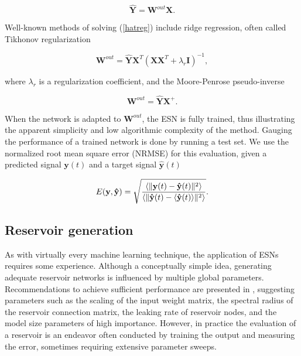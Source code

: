 
\begin{equation}
  \mathbf{\hat{Y}} = \mathbf{W}^{out}\mathbf{X}.
  \label{hatreg}
\end{equation}

Well-known methods of solving (\ref{hatreg}) include ridge regression, often
called Tikhonov regularization

\begin{equation}
  \mathbf{W}^{out} = \mathbf{\hat{Y}}\mathbf{X}^{T}
                    (\mathbf{X}\mathbf{X}^{T} + \lambda_{r}\mathbf{I})^{-1},
  \label{tikhonov}
\end{equation}

\noindent where $\lambda_{r}$ is a regularization coefficient, and the
Moore-Penrose pseudo-inverse

\begin{equation}
  \mathbf{W}^{out} = \mathbf{\hat{Y}}\mathbf{X}^{+}.
  \label{pseudo}
\end{equation}

When the network is adapted to $\mathbf{W}^{out}$, the ESN is fully trained,
thus illustrating the apparent simplicity and low algorithmic complexity of the
method. Gauging the performance of a trained network is done by running a test
set. We use the normalized root mean square error (NRMSE) for this evaluation,
given a predicted signal $\mathbf{y}(t)$ and a target signal
$\mathbf{\hat{y}}(t)$

\begin{equation}
  E(\mathbf{y}, \mathbf{\hat{y}}) = \sqrt{\frac{
      \langle\Vert \mathbf{y}(t) - \mathbf{\hat{y}}(t) \Vert^{2}\rangle
    }{
      \langle\Vert \mathbf{\hat{y}}(t) - \langle\mathbf{\hat{y}}(t)\rangle \Vert^{2}\rangle
    }
  }
  .
  \label{nrmse}
\end{equation}

\subsection{Reservoir generation}

As with virtually every machine learning technique, the application of ESNs
requires some experience. Although a conceptually simple idea, generating
adequate reservoir networks is influenced by multiple global
parameters. Recommendations to achieve sufficient performance are presented in
\cite{montavon_practical_2012, jaeger_tutorial_nodate}, suggesting parameters
such as the scaling of the input weight matrix, the spectral radius of the
reservoir connection matrix, the leaking rate of reservoir nodes, and the model
size parameters of high importance. However, in practice the evaluation of a
reservoir is an endeavor often conducted by training the output and measuring
the error, sometimes requiring extensive parameter sweeps.

